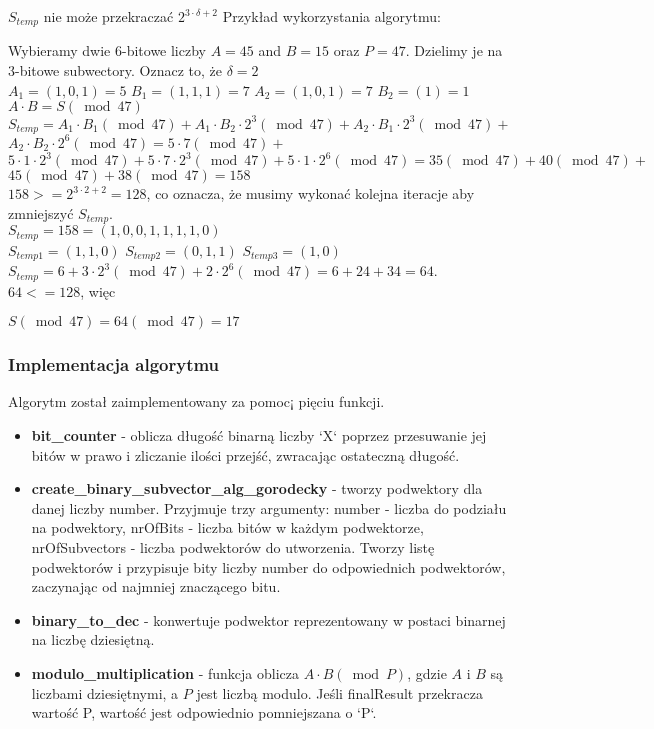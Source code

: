 \documentclass[11pt]{article}
\renewcommand\*{\cdot}
\begin{document}
$S_{temp}$ nie może przekraczać  $ 2^{3 \cdot \delta+2}$
\newpage
Przykład wykorzystania algorytmu:


Wybieramy dwie 6-bitowe liczby $A=45$ and $B=15$ oraz $P=47$. Dzielimy je na 3-bitowe subwectory. Oznacz to, że $\delta = 2$
\\
$A_1=\left(1, 0, 1\right) = 5$
$B_1=\left(1,1,1\right) = 7$
$A_2=\left(1, 0, 1\right) = 7$
$B_2=\left(1\right) = 1$
$A \cdot B=S(\bmod 47)$\\

$S_{temp} = A_1 \cdot B_1(\bmod 47)+A_1 \cdot B_2 \cdot 2^3(\bmod 47)+A_2 \cdot B_1 \cdot 2^3(\bmod 47)+$ $A_2 \cdot B_2 \cdot 2^6(\bmod 47) =5 \cdot 7(\bmod 47)+$ $5 \cdot 1 \cdot 2^3(\bmod 47)+5 \cdot 7 \cdot 2^3(\bmod 47)+5 \cdot 1 \cdot 2^6(\bmod 47)=35(\bmod 47)+40(\bmod 47)+$ $45(\bmod 47)+38(\bmod 47)=158$
\\


$158 >= 2^{3 \cdot 2+2} = 128$, co oznacza, że musimy wykonać kolejna iteracje aby zmniejszyć $S_{temp}$.
\\


$S_{temp} = 158 = \left(1,0,0,1,1,1,1,0\right)$
\\

$S_{temp1} = \left(1,1,0 \right)$
$S_{temp2} = \left(0,1,1 \right)$
$S_{temp3} = \left(1,0 \right)$
\\

$S_{temp} =6+3 \cdot 2^3(\bmod 47)+2 \cdot 2^6(\bmod 47)=6+24+34=64$.
\\

$64 <=  128$, więc

$S(\bmod 47) = 64(\bmod 47) = 17$


\subsubsection{Implementacja algorytmu}
Algorytm został zaimplementowany za pomoc¡ pięciu funkcji.
\begin{itemize}
    \item \textbf{bit\_counter} - oblicza długość binarną liczby `X` poprzez przesuwanie jej bitów w prawo i zliczanie ilości przejść, zwracając ostateczną długość.
    \item \textbf{create\_binary\_subvector\_alg\_gorodecky} - tworzy podwektory dla danej liczby number. Przyjmuje trzy argumenty: number - liczba do podziału na podwektory, nrOfBits - liczba bitów w każdym podwektorze, nrOfSubvectors - liczba podwektorów do utworzenia. Tworzy listę podwektorów i przypisuje bity liczby number do odpowiednich podwektorów, zaczynając od najmniej znaczącego bitu.
    \item \textbf{binary\_to\_dec} - konwertuje podwektor reprezentowany w postaci binarnej na liczbę dziesiętną.
    \item \textbf{modulo\_multiplication} - funkcja oblicza $A \cdot B(\bmod P)$, gdzie $A$ i $B$ są liczbami dziesiętnymi, a $P$ jest liczbą modulo. Jeśli finalResult przekracza wartość P, wartość jest odpowiednio pomniejszana o `P`.
\end{itemize}
\end{document}
